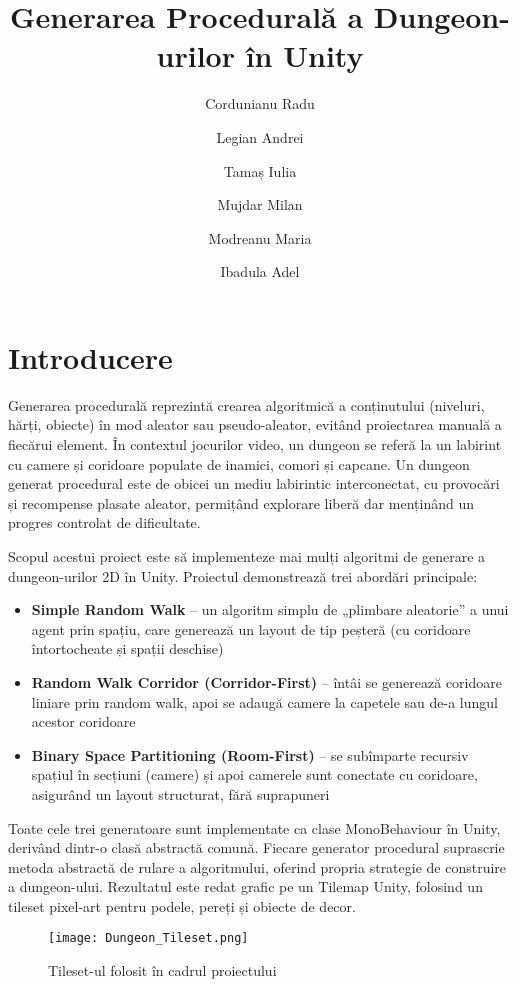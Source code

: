 \documentclass{article}
\begin{document}
	
	\title{Generarea Procedurală a
		Dungeon-urilor în Unity}
	\author{Cordunianu Radu \and Legian Andrei \and Tamaș Iulia \and Mujdar Milan \and Modreanu Maria \and Ibadula Adel}
	\date{}
	\maketitle
	
	\section{Introducere}
	\tab  Generarea procedurală reprezintă crearea algoritmică a conținutului (niveluri, hărți, obiecte) în mod aleator sau pseudo-aleator, evitând proiectarea manuală a fiecărui element.\cite{wiki-procgen} În contextul jocurilor video, un dungeon se referă la un labirint cu camere și coridoare populate de inamici, comori și capcane. Un dungeon generat procedural este de obicei un mediu labirintic interconectat, cu provocări și recompense
	plasate aleator, permițând explorare liberă dar menținând un progres controlat de dificultate. \cite{intro}
	
	Scopul acestui proiect este să implementeze mai mulți algoritmi de generare a dungeon-urilor 2D în Unity. Proiectul demonstrează trei abordări
	principale:
	\begin{itemize}
		\item \textbf{Simple Random Walk} – un algoritm simplu de „plimbare aleatorie” a unui agent prin spațiu, care generează un layout de tip peșteră (cu coridoare întortocheate și spații deschise)
		\item \textbf{Random Walk Corridor (Corridor-First)} – întâi se generează coridoare liniare prin random walk, apoi se adaugă camere la capetele sau de-a lungul acestor coridoare
		\item \textbf{Binary Space Partitioning (Room-First)} – se subîmparte recursiv spațiul în secțiuni (camere) și apoi camerele sunt conectate cu coridoare, asigurând un layout structurat, fără suprapuneri
	\end{itemize}
	
	 Toate cele trei generatoare sunt implementate ca clase MonoBehaviour în Unity, derivând dintr-o clasă abstractă comună.  Fiecare generator
	 procedural suprascrie metoda abstractă de rulare a algoritmului, oferind propria strategie de construire a dungeon-ului. Rezultatul este redat grafic pe un Tilemap Unity, folosind un tileset pixel-art pentru podele,
	 pereți și obiecte de decor.
	 \begin{figure}
	 	\centering
	 	\texttt{[image: Dungeon\_Tileset.png]}
	 	\caption{Tileset-ul folosit în cadrul proiectului}
	 \end{figure}
	 \newpage
	 
\end{document}
